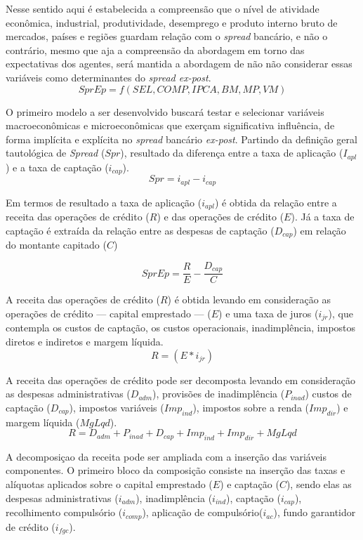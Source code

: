 \documentclass[12pt,12pt,openright,oneside,a4paper,chapter=TITLE,section=TITLE,subsection=TITLE,subsubsection=TITLE,english,french,spanish,portugues,sumario=tradicional]{abntex2}
\begin{document}
Nesse sentido aqui é estabelecida a compreensão que o nível de atividade econômica, industrial, produtividade, desemprego e produto interno bruto de mercados, países e regiões guardam relação com o \emph{spread} bancário, e não o contrário, mesmo que aja a compreensão da abordagem em torno das expectativas dos agentes, será mantida a abordagem de não não considerar essas variáveis como determinantes do \emph{spread ex-post}.
\[
SprEp = f(SEL,COMP,IPCA,BM,MP,VM)
\]

O primeiro modelo a ser desenvolvido buscará testar e selecionar variáveis macroeconômicas e microeconômicas que exerçam significativa influência, de forma implícita e explícita no \emph{spread} bancário \emph{ex-post}. Partindo da definição geral tautológica de \emph{Spread} (\(Spr\)), resultado da diferença entre a taxa de aplicação (\(I_{apl}\)) e a taxa de captação (\(i_{cap}\)).
\[
Spr = i_{apl} - i_{cap} 
\]

Em termos de resultado a taxa de aplicação (\(i_{apl}\)) é obtida da relação entre a receita das operações de crédito (\(R\)) e das operações de crédito (\(E\)). Já a taxa de captação é extraída da relação entre as despesas de captação (\(D_{cap}\)) em relação do montante capitado (\(C\))

\[
SprEp = \frac{R}{E} - \frac{D_{cap}}{C}
\]

A receita das operações de crédito (\(R\)) é obtida levando em consideração as operações de crédito --- capital emprestado --- (\(E\)) e uma taxa de juros (\(i_{jr}\)), que contempla os custos de captação, os custos operacionais, inadimplência, impostos diretos e indiretos e margem líquida.
\[
R= (E * i_{jr}) 
\]

A receita das operações de crédito pode ser decomposta levando em consideração as despesas administrativas (\(D_{adm}\)), provisões de inadimplência (\(P_{inad}\)) custos de captação (\(D_{cap}\)), impostos variáveis (\(Imp_{ind}\)), impostos sobre a renda (\(Imp_{dir}\)) e margem líquida (\(MgLqd\)).
\[
R = D_{adm} + P_{inad} + D_{cap} + Imp_{ind} + Imp_{dir} + MgLqd
\]

A decomposiçao da receita pode ser ampliada com a inserção das variáveis componentes. O primeiro bloco da composição consiste na inserção das taxas e alíquotas aplicados sobre o capital emprestado (\(E\)) e captação (\(C\)), sendo elas as despesas administrativas (\(i_{adm}\)), inadimplência (\(i_{ind}\)), captação (\(i_{cap}\)), recolhimento compulsório (\(i_{comp}\)), aplicação de compulsório(\(i_{ac}\)), fundo garantidor de crédito (\(i_{fgc}\)).
\end{document}
